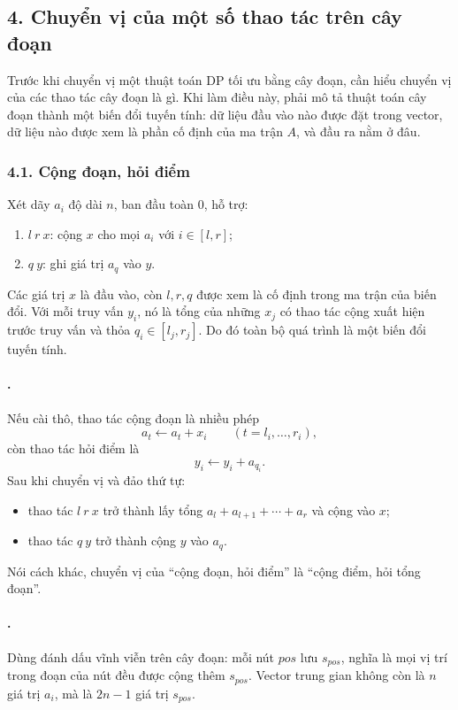 \documentclass[11pt]{article}
\begin{document}
\subsection*{4. Chuyển vị của một số thao tác trên cây đoạn}

Trước khi chuyển vị một thuật toán DP tối ưu bằng cây đoạn, cần hiểu chuyển vị
của các thao tác cây đoạn là gì. Khi làm điều này, phải mô tả thuật toán cây
đoạn thành một biến đổi tuyến tính: dữ liệu đầu vào nào được đặt trong vector,
dữ liệu nào được xem là phần cố định của ma trận \(A\), và đầu ra nằm ở đâu.

\subsubsection*{4.1. Cộng đoạn, hỏi điểm}

Xét dãy \(a_i\) độ dài \(n\), ban đầu toàn \(0\), hỗ trợ:
\begin{enumerate}
  \item \(l\ r\ x\): cộng \(x\) cho mọi \(a_i\) với \(i\in[l,r]\);
  \item \(q\ y\): ghi giá trị \(a_q\) vào \(y\).
\end{enumerate}
Các giá trị \(x\) là đầu vào, còn \(l,r,q\) được xem là cố định trong ma trận
của biến đổi. Với mỗi truy vấn \(y_i\), nó là tổng của những \(x_j\) có thao tác
cộng xuất hiện trước truy vấn và thỏa \(q_i\in[l_j,r_j]\). Do đó toàn bộ quá
trình là một biến đổi tuyến tính.

\paragraph{.}
Nếu cài thô, thao tác cộng đoạn là nhiều phép
\[
  a_t\leftarrow a_t+x_i\qquad (t=l_i,\ldots,r_i),
\]
còn thao tác hỏi điểm là
\[
  y_i\leftarrow y_i+a_{q_i}.
\]
Sau khi chuyển vị và đảo thứ tự:
\begin{itemize}
  \item thao tác \(l\ r\ x\) trở thành lấy tổng
  \(a_l+a_{l+1}+\cdots+a_r\) và cộng vào \(x\);
  \item thao tác \(q\ y\) trở thành cộng \(y\) vào \(a_q\).
\end{itemize}
Nói cách khác, chuyển vị của ``cộng đoạn, hỏi điểm'' là ``cộng điểm, hỏi tổng
đoạn''.

\paragraph{.}
Dùng đánh dấu vĩnh viễn trên cây đoạn: mỗi nút \(pos\) lưu \(s_{pos}\), nghĩa
là mọi vị trí trong đoạn của nút đều được cộng thêm \(s_{pos}\). Vector trung
gian không còn là \(n\) giá trị \(a_i\), mà là \(2n-1\) giá trị \(s_{pos}\).
\end{document}
